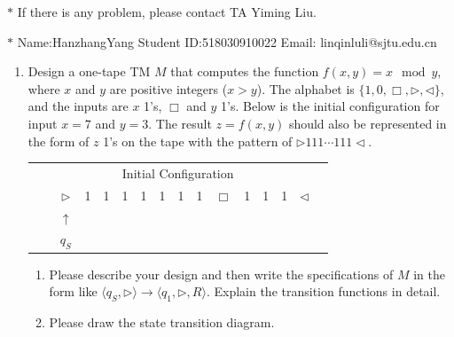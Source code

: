 \documentclass[12pt,a4paper]{article}
\theoremstyle{definition}
\begin{document}
\noindent

\noindent{}
\begin{center}
\footnotesize{\color{red}$*$ If there is any problem, please contact TA Yiming Liu. }

\footnotesize{\color{blue}$*$ Name:HanzhangYang  \quad Student ID:518030910022 \quad Email: linqinluli@sjtu.edu.cn}
\end{center}

\begin{enumerate}

\item
Design a one-tape TM $M$ that computes the function $f(x, y) = x \mod y$, where $x$ and $y$ are positive integers ($x > y$). The alphabet is $\{1, 0, \Box, \triangleright, \triangleleft\}$, and the inputs are $x$ 1's, $\Box$ and $y$ 1's. Below is the initial configuration for input $x=7$ and $y=3$. The result $z=f(x, y)$ should also be represented in the form of $z$ 1's on the tape with the pattern of $\triangleright 111 \cdots 111 \triangleleft$.
\begin{center}
	\begin{tabular}{ll|c|c|c|c|c|c|c|c|c|c|c|c|c|c}
		& \multicolumn{14}{c}{Initial Configuration}\\[5pt]
		\cline{2-16}
		& & $\triangleright$ &  1  & 1 & 1 & 1 & 1 & 1 & 1 & $\Box$ & 1 & 1 & 1 & $ \triangleleft$ & \\
		\cline{2-16}
		\multicolumn{2}{c}{} & \multicolumn{1}{c}{$\uparrow$} & \multicolumn{11}{c}{}\\[-4px]
		\multicolumn{2}{c}{} & \multicolumn{1}{c}{$q_S$} & \multicolumn{11}{c}{}	
	\end{tabular}
\end{center}

\begin{enumerate}
	\item
	Please describe your design and then write the specifications of $M$ in the form like $\langle q_S, \triangleright \rangle \rightarrow \langle q_1, \triangleright,  R\rangle$. Explain the transition functions in detail.
	
	\item
	Please draw the state transition diagram.
	

\end{enumerate}
\end{enumerate}
\end{document}
